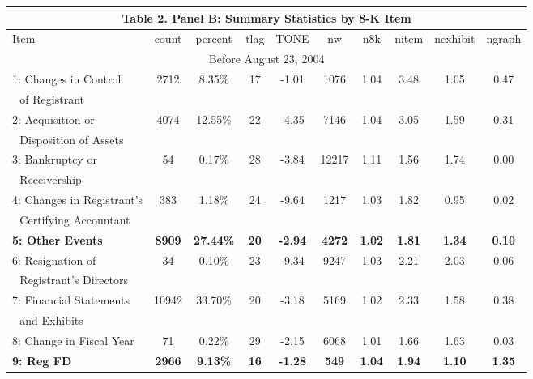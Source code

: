 \begin{table}[H]   \label{T2PB}%
  \begin{center}
  	\begin{tabular}{lccccccccc}
  		\multicolumn{10}{c}{\textbf{Table 2. Panel B: Summary Statistics by 8-K Item}} \\
  		\midrule
  		\midrule
  		Item & \multicolumn{1}{c}{count} & \multicolumn{1}{c}{percent} & \multicolumn{1}{c}{tlag} & \multicolumn{1}{c}{TONE} & \multicolumn{1}{c}{nw} & \multicolumn{1}{c}{n8k} & \multicolumn{1}{c}{nitem} & \multicolumn{1}{c}{nexhibit} & \multicolumn{1}{c}{ngraph}\\
  		\midrule
  		\multicolumn{10}{c}{Before August 23, 2004} \\
  		\midrule
  		1: Changes in Control & 2712 & 8.35\% & 17 & -1.01 & 1076 & 1.04 & 3.48 & 1.05 & 0.47 \\
  		\: \,\, of Registrant & &  &  &  & & & & & \\
  		2: Acquisition or & 4074 & 12.55\% & 22 & -4.35 & 7146 & 1.04 & 3.05 & 1.59 & 0.31 \\
  		\: \,\, Disposition of Assets & &  &  &  & & & & & \\
  		3: Bankruptcy or & 54 & 0.17\% & 28 & -3.84 & 12217 & 1.11 & 1.56 & 1.74 & 0.00 \\
  		\: \,\, Receivership & &  &  &  & & & & & \\
  		4: Changes in Registrant's & 383 & 1.18\% & 24 & -9.64 & 1217 & 1.03 & 1.82 & 0.95 & 0.02 \\
  		\: \,\, Certifying Accountant & &  &  &  & & & & & \\
  		\textbf{5: Other Events} & \textbf{8909} & \textbf{27.44\%} & \textbf{20} & \textbf{-2.94} & \textbf{4272} & \textbf{1.02} & \textbf{1.81} & \textbf{1.34} & \textbf{0.10} \\
  		6: Resignation of & 34 & 0.10\% & 23 & -9.34 & 9247 & 1.03 & 2.21 & 2.03 & 0.06 \\
  		\: \,\, Registrant's Directors & &  &  &  & & & & & \\
  		7: Financial Statements & 10942 & 33.70\% & 20 & -3.18 & 5169 & 1.02 & 2.33 & 1.58 & 0.38 \\
  		\: \,\, and Exhibits & &  &  &  & & & & & \\
  		8: Change in Fiscal Year & 71 & 0.22\% & 29 & -2.15 & 6068 & 1.01 & 1.66 & 1.63 & 0.03 \\
  		\textbf{9: Reg FD} & \textbf{2966} & \textbf{9.13\%} & \textbf{16} & \textbf{-1.28} & \textbf{549} & \textbf{1.04} & \textbf{1.94} & \textbf{1.10} & \textbf{1.35} \\

\end{tabular}
\end{center}
\end{table}
